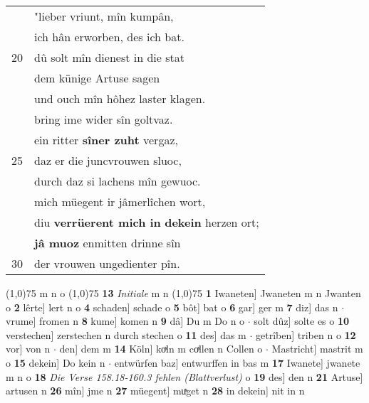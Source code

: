 \documentclass[8pt,a4paper,notitlepage]{article}
\begin{document}
\begin{table}[ht]
\begin{minipage}[t]{0.5\linewidth}
\begin{tabular}{rl}
 & "lieber vriunt, mîn kumpân,\\ 
 & ich hân erworben, des ich bat.\\ 
20 & dû solt mîn dienest in die stat\\ 
 & dem künige Artuse sagen\\ 
 & und ouch mîn hôhez laster klagen.\\ 
 & bring ime wider sîn goltvaz.\\ 
 & ein ritter \textbf{sîner zuht} vergaz,\\ 
25 & daz er die juncvrouwen sluoc,\\ 
 & durch daz si lachens mîn gewuoc.\\ 
 & mich müegent ir jâmerlîchen wort,\\ 
 & diu \textbf{verrüerent mich in} \textbf{dekein} herzen ort;\\ 
 & \textbf{jâ muoz} enmitten drinne sîn\\ 
30 & der vrouwen ungedienter pîn.\\ 
\end{tabular}
\scriptsize
\line(1,0){75} \newline
m n o \newline
\line(1,0){75} \newline
\textbf{13} \textit{Initiale} m n  \newline
\line(1,0){75} \newline
\textbf{1} Iwaneten] Jwaneten m n Jwanten o \textbf{2} lêrte] lert n o \textbf{4} schaden] schade o \textbf{5} bôt] bat o \textbf{6} gar] ger m \textbf{7} diz] das n  $\cdot$ vrume] fromen n \textbf{8} kume] komen n \textbf{9} dâ] Du m Do n o  $\cdot$ solt dûz] solte es o \textbf{10} verstechen] zerstechen n durch stechen o \textbf{11} des] das m  $\cdot$ getrîben] triben n o \textbf{12} vor] von n  $\cdot$ den] dem m \textbf{14} Köln] koͯln m coͯllen n Collen o  $\cdot$ Mastricht] mastrit m o \textbf{15} dekein] Do kein n  $\cdot$ entwürfen baz] entwurffen in bas m \textbf{17} Iwanete] jwanete m n o \textbf{18} \textit{Die Verse 158.18-160.3 fehlen (Blattverlust)} o  \textbf{19} des] den n \textbf{21} Artuse] artusen n \textbf{26} mîn] jme n \textbf{27} müegent] muͯget n \textbf{28} in dekein] nit in n \newline
\end{minipage}
\end{table}
\newpage
\end{document}
